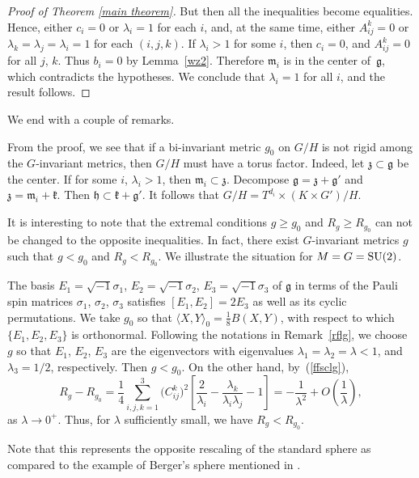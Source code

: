 \documentclass[10pt,a4paper]{amsart}
\begin{document}
\begin{proof}[Proof of Theorem \ref{main theorem}]
But then all the inequalities become equalities. Hence, either $c_i=0$ or $\lambda_i=1$ for each $i$, and, at the same time, either $A^k_{ij}=0$ or $\lambda_{k}= \lambda_{j}= \lambda_{i}=1$ for each $(i,j,k)$.
If $\lambda_i>1$ for some $i$, then $c_i=0$, and $A^k_{ij}=0$ for all $j$, $k$. Thus $b_i=0$ by Lemma~\ref{wz2}. Therefore $\mathfrak{m}_i$ is in the center of~$\mathfrak{g}$, which contradicts the hypotheses. We conclude that $\lambda_i=1$ for all $i$, and the result follows.
\end{proof}


We end with a couple of remarks.

\begin{Remark}
From the proof, we see that if a bi-invariant metric $g_0$	 on $G/H$ is not rigid among the $G$-invariant metrics, then $G/H$ must have a torus factor. Indeed, let $\mathfrak{z} \subset \mathfrak{g}$ be the center. If for some $i$, $\lambda_i>1$, then $\mathfrak{m}_i \subset \mathfrak{z}$. Decompose $\mathfrak{g}=\mathfrak{z} + \mathfrak{g'}$ and $\mathfrak{z}=\mathfrak{m}_i + \mathfrak{k}$. Then $\mathfrak{h} \subset \mathfrak{k} +\mathfrak{g'} $. It follows that $G/H=T^{d_i} \times (K\times G')/H$.
	\end{Remark}

\begin{Remark}
It is interesting to note that the extremal conditions $g\geq g_0$ and $R_g\geq R_{g_0}$ can not be changed to the opposite inequalities. In fact, there exist $G$-invariant metrics $g$ such that $g< g_0$ and $R_g< R_{g_0}$. We illustrate the situation for $M=G={\rm SU}(2)$.

The basis $E_1=\sqrt{-1}\sigma_1$, $E_2=\sqrt{-1}\sigma_2$, $E_3=\sqrt{-1}\sigma_3$ of $\mathfrak{g}$ in terms of the Pauli spin matrices $\sigma_1$, $\sigma_2$, $\sigma_3$ satisfies
$[E_1, E_2]=2E_3$ as well as its cyclic permutations. We take $g_0$ so that $\langle X, Y \rangle_0=\frac{1}{8}B(X, Y)$, with respect to which $\{ E_1, E_2, E_3 \}$ is orthonormal.
Following the notations in Remark~\ref{rflg}, we choose $g$ so that $E_1$, $E_2$, $E_3$ are the eigenvectors with eigenvalues $\lambda_1=\lambda_2=\lambda <1$, and $\lambda_3=1/2$, respectively. Then $g<g_0$. On the other hand, by~(\ref{ffsclg}),
\[
R_g-R_{g_0}= \frac{1}{4} \sum_{i, j, k=1}^3 \big(C^k_{ij}\big)^2
\left[ \frac{2}{\lambda_i}- \frac{\lambda_{k}}{\lambda_i\lambda_{j}} -1 \right]= -\frac{1}{\lambda^2} + O\left(\frac{1}{\lambda}\right),
\]
as $\lambda \rightarrow 0^{+}$. Thus, for $\lambda$ sufficiently small, we have $R_g< R_{g_0}$.

Note that this represents the opposite rescaling of the standard sphere as compared to the example of Berger's sphere mentioned in \cite[p.~34]{14}.
\end{Remark}
\end{document}
